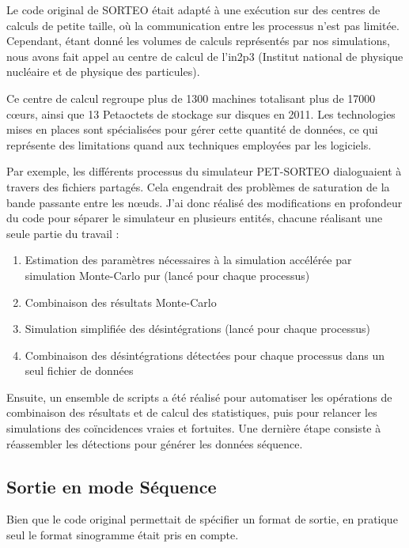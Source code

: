 Le code original de SORTEO était adapté à une exécution sur des centres de calculs de petite taille, où la communication entre les processus n’est pas limitée. Cependant, étant donné les volumes de calculs représentés par nos simulations, nous avons fait appel au centre de calcul de l'in2p3 (Institut national de physique nucléaire et de physique des particules).

Ce centre de calcul regroupe plus de 1300 machines totalisant plus de 17000 cœurs, ainsi que 13 Petaoctets de stockage sur disques en 2011. Les technologies mises en places sont spécialisées pour gérer cette quantité de données, ce qui représente des limitations quand aux techniques employées par les logiciels.

Par exemple, les différents processus du simulateur PET-SORTEO dialoguaient à travers des fichiers partagés. Cela engendrait des problèmes de saturation de la bande passante entre les nœuds. J'ai donc réalisé des modifications en profondeur du code pour séparer le simulateur en plusieurs entités, chacune réalisant une seule partie du travail :

    \begin{enumerate}
        \item Estimation des paramètres nécessaires à la simulation accélérée par simulation Monte-Carlo pur (lancé pour chaque processus)
        \item Combinaison des résultats Monte-Carlo
        \item Simulation simplifiée des désintégrations (lancé pour chaque processus)
        \item Combinaison des désintégrations détectées pour chaque processus dans un seul fichier de données
    \end{enumerate}

Ensuite, un ensemble de scripts a été réalisé pour automatiser les opérations de combinaison des résultats et de calcul des statistiques, puis pour relancer les simulations des coïncidences vraies et fortuites. Une dernière étape consiste à réassembler les détections pour générer les données séquence.

\subsection{Sortie en mode Séquence}

Bien que le code original permettait de spécifier un format de sortie, en pratique seul le format sinogramme était pris en compte. 

